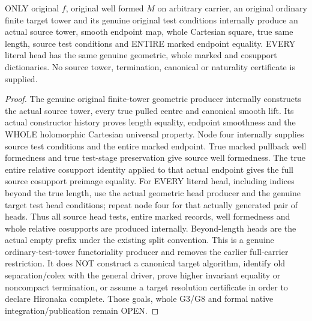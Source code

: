 \begin{theorem}
\label{hir:submersion-relative-control-original-all-heads}
\leanok
ONLY original $f$, original well formed $M$ on arbitrary carrier, an original
ordinary finite target tower and its genuine original test conditions
internally produce an actual source tower, smooth endpoint map, whole
Cartesian square, true same length, source test conditions and ENTIRE marked
endpoint equality. EVERY literal head has the same genuine geometric,
whole marked and cosupport dictionaries. No source tower, termination,
canonical or naturality certificate is supplied.
\end{theorem}
\begin{proof}
The genuine original finite-tower geometric producer internally constructs
the actual source tower, every true pulled centre and canonical smooth lift.
Its actual constructor history proves length equality, endpoint smoothness
and the WHOLE holomorphic Cartesian universal property. Node four internally
supplies source test conditions and the entire marked endpoint. True marked
pullback well formedness and true test-stage preservation give source well
formedness. The true entire relative cosupport identity applied to that
actual endpoint gives the full source cosupport preimage equality.
For EVERY literal head, including indices beyond the true length, use the
actual geometric head producer and the genuine target test head conditions;
repeat node four for that actually generated pair of heads. Thus all source
head tests, entire marked records, well formedness and whole relative
cosupports are produced internally. Beyond-length heads are the actual
empty prefix under the existing split convention. This is a genuine
ordinary-test-tower functoriality producer and removes the earlier
full-carrier restriction. It does NOT construct a canonical target algorithm,
identify old separation/colex with the general driver, prove higher
invariant equality or noncompact termination, or assume a target resolution
certificate in order to declare Hironaka complete. Those goals, whole G3/G8
and formal native integration/publication remain OPEN.
\end{proof}

